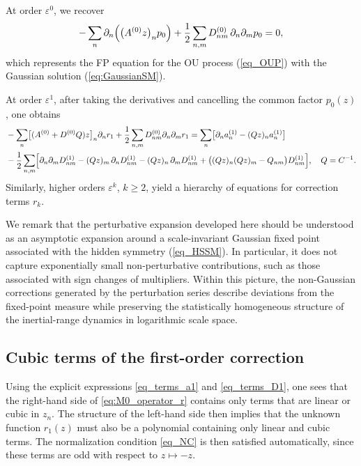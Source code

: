 \documentclass[aps,twocolumn,superscriptaddress]{revtex4-2}
\begin{document}
At order \(\varepsilon^0\), we recover
\begin{equation}
-\sum_n \partial_n\Bigl( \big(A^{(0)}z\big)_n p_0\Bigr)
+\frac12\sum_{n,m} D^{(0)}_{nm}\,\partial_n\partial_m p_0 = 0,
\label{eq_perut_order0}
\end{equation}
which represents the FP equation for the OU process (\ref{eq_OUP}) with the Gaussian solution (\ref{eq:GaussianSM}).

At order $\varepsilon^1$, after taking the derivatives and cancelling the common factor $p_0(z)$, one obtains
\begin{equation}
\begin{aligned}
&
-\sum_n\bigl[(A^{(0)}+D^{(0)}Q)z\bigr]_n\partial_n r_1
+\frac12\sum_{n,m}D^{(0)}_{nm}\partial_n\partial_m r_1
=
\sum_n\bigl[\partial_n a_n^{(1)}-(Qz)_n a_n^{(1)}\bigr]
\\
&
-\frac12\sum_{n,m}
\Bigl[
\partial_n\partial_m D^{(1)}_{nm}
-(Qz)_m\,\partial_n D^{(1)}_{nm}
-(Qz)_n\,\partial_m D^{(1)}_{nm}
+\bigl((Qz)_n(Qz)_m-Q_{nm}\bigr)D^{(1)}_{nm}
\Bigr], \quad Q = C^{-1}.
\end{aligned}
\label{eq:M0_operator_r}
\end{equation}
Similarly, higher orders $\varepsilon^k$, $k \ge 2$, yield a hierarchy of equations for correction terms $r_k$.

We remark that the perturbative expansion developed here should be understood as an asymptotic expansion around a scale-invariant Gaussian fixed point associated with the hidden symmetry (\ref{eq_HSSM}). In particular, it does not capture exponentially small non-perturbative contributions, such as those associated with sign changes of multipliers. Within this picture, the non-Gaussian corrections generated by the perturbation series describe deviations from the fixed-point measure while preserving the statistically homogeneous structure of the inertial-range dynamics in logarithmic scale space.

\subsection{Cubic terms of the first-order correction}

Using the explicit expressions \eqref{eq_terms_a1} and \eqref{eq_terms_D1}, one
sees that the right-hand side of \eqref{eq:M0_operator_r} contains only terms
that are linear or cubic in \(z_n\). The structure of the left-hand side then
implies that the unknown function \(r_1(z)\) must also be a polynomial containing
only linear and cubic terms. The normalization condition
\eqref{eq_NC} is then satisfied automatically, since these terms are odd
with respect to \(z \mapsto -z\).
\end{document}
